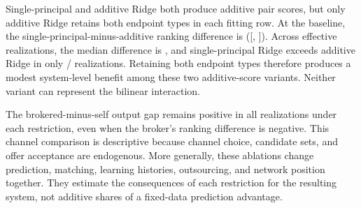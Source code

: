 Single-principal and additive Ridge both produce additive pair scores, but only
additive Ridge retains both endpoint types in each fitting row. At the baseline,
the single-principal-minus-additive ranking difference is
([,
]). Across effective
realizations, the median difference is
, and single-principal Ridge exceeds
additive Ridge in only
/ realizations.
Retaining both endpoint types therefore produces a modest system-level benefit
among these two additive-score variants. Neither variant can represent the
bilinear interaction.

The brokered-minus-self output gap remains positive in all
 realizations under each restriction, even when the broker's
ranking difference is negative. This channel comparison is descriptive because
channel choice, candidate sets, and offer acceptance are endogenous. More
generally, these ablations change prediction, matching, learning histories,
outsourcing, and network position together. They estimate the consequences of
each restriction for the resulting system, not additive shares of a fixed-data
prediction advantage.
